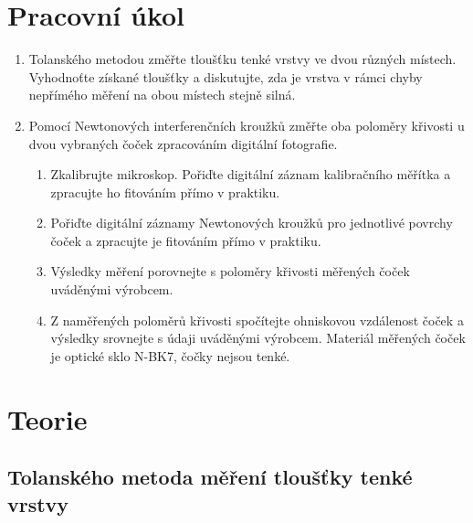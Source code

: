 \documentclass{../concepts/titul_protokol_p/prepareprotokol} %
\begin{document}
\renewcommand{\figurename}{Graf}
\renewcommand{\refname}{Literatura}
\renewcommand{\today}{\number\day.\,\number\month.\,\number\year}

\graphicspath{{../concepts/titul_protokol_p/}}
\maketitle


\section{Pracovní úkol}
\begin{enumerate}
    \item Tolanského metodou změřte tloušťku tenké vrstvy ve dvou různých místech. Vyhodnoťte získané tloušťky a diskutujte, zda je vrstva v rámci chyby nepřímého měření na obou místech stejně silná.
    \item Pomocí Newtonových interferenčních kroužků změřte oba poloměry křivosti u dvou vybraných čoček zpracováním digitální fotografie.
    \begin{enumerate}
        \item Zkalibrujte mikroskop. Pořiďte digitální záznam kalibračního měřítka a zpracujte ho fitováním přímo v praktiku.
        \item Pořiďte digitální záznamy Newtonových kroužků pro jednotlivé povrchy čoček a zpracujte je fitováním přímo v praktiku.
        \item Výsledky měření porovnejte s poloměry křivosti měřených čoček uváděnými výrobcem.
        \item Z naměřených poloměrů křivosti spočítejte ohniskovou vzdálenost čoček a výsledky srovnejte s údaji uváděnými výrobcem. Materiál měřených čoček je optické sklo N-BK7, čočky nejsou tenké.
    \end{enumerate}
\end{enumerate}

\section{Teorie}
\subsection{Tolanského metoda měření tloušťky tenké vrstvy}
\end{document}
